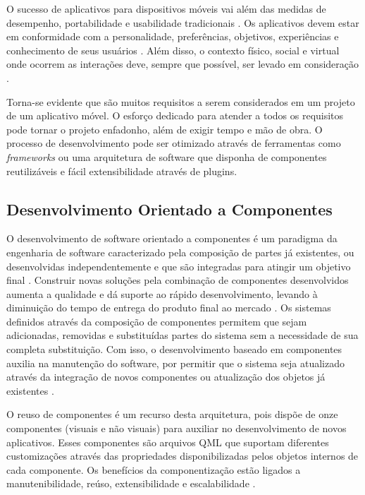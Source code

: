 O sucesso de aplicativos para dispositivos móveis vai além das medidas de desempenho, portabilidade e usabilidade tradicionais \cite{Kronbauer:2012:UEE:2393536.2393582}. Os aplicativos devem estar em conformidade com a personalidade, preferências, objetivos, experiências e conhecimento de seus usuários \cite{Vermeeren:2010:UEE:1868914.1868973}. Além disso, o contexto físico, social e virtual onde ocorrem as interações deve, sempre que possível, ser levado em consideração \cite{McCarthy:2004:TE:1015530.1015549}.\par

Torna-se evidente que são muitos requisitos a serem considerados em um projeto de um aplicativo móvel. O esforço dedicado para atender a todos os requisitos pode tornar o projeto enfadonho, além de exigir tempo e mão de obra. O processo de desenvolvimento pode ser otimizado através de ferramentas como \textit{frameworks} ou uma arquitetura de software que disponha de componentes reutilizáveis e fácil extensibilidade através de plugins.


\subsection{Desenvolvimento Orientado a Componentes} %
O desenvolvimento de software orientado a componentes é um paradigma da engenharia de software caracterizado pela composição de partes já existentes, ou desenvolvidas independentemente e que são integradas para atingir um objetivo final \cite{rafael_heider}. Construir novas soluções pela combinação de componentes desenvolvidos aumenta a qualidade e dá suporte ao rápido desenvolvimento, levando à diminuição do tempo de entrega do produto final ao mercado \cite{rafael_heider}. Os sistemas definidos através da composição de componentes permitem que sejam adicionadas, removidas e substituídas partes do sistema sem a necessidade de sua completa substituição. Com isso, o desenvolvimento baseado em componentes auxilia na manutenção do software, por permitir que o sistema seja atualizado através da integração de novos componentes ou atualização dos objetos já existentes \cite{szyperski_bosch_weck_1999}.\par

O reuso de componentes é um recurso desta arquitetura, pois dispõe de onze componentes (visuais e não visuais) para auxiliar no desenvolvimento de novos aplicativos. Esses componentes são arquivos QML que suportam diferentes customizações através das propriedades disponibilizadas pelos objetos internos de cada componente. Os benefícios da componentização estão ligados a manutenibilidade, reúso, extensibilidade e escalabilidade \cite{D'Souza:1998:OCF:291139}.


